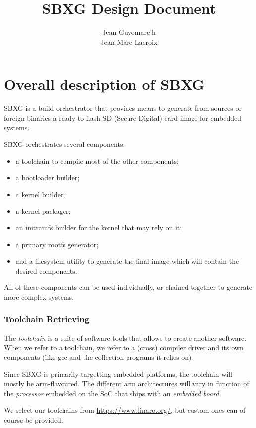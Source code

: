 \documentclass{article}
\title{SBXG Design Document}
\date{}
\author{%
  Jean Guyomarc'h%
  \\Jean-Marc Lacroix%
}
\begin{document}
\maketitle
\tableofcontents
\clearpage

\part{Overall description of SBXG}

SBXG is a build orchestrator that provides means to generate from sources or
foreign binaries a ready-to-flash SD (Secure Digital) card image for embedded
systems.

SBXG orchestrates several components:
\begin{itemize}
\item a toolchain to compile most of the other components;
\item a bootloader builder;
\item a kernel builder;
\item a kernel packager;
\item an initramfs builder for the kernel that may rely on it;
\item a primary rootfs generator;
\item and a filesystem utility to generate the final image which will contain the
  desired components.
\end{itemize}

All of these components can be used individually, or chained together to
generate more complex systems.



\section{Toolchain Retrieving}

The \emph{toolchain} is a suite of software tools that allows to create another
software. When we refer to a toolchain, we refer to a (cross) compiler driver
and its own components (like gcc and the collection programs it relies on).

Since SBXG is primarily targetting embedded platforms, the toolchain will mostly
be arm-flavoured. The different arm architectures will vary in function of the
\emph{processor} embedded on the SoC that ships with an \emph{embedded board}.

We select our toolchains from \url{https://www.linaro.org/}, but custom ones can
of course be provided.
\end{document}
